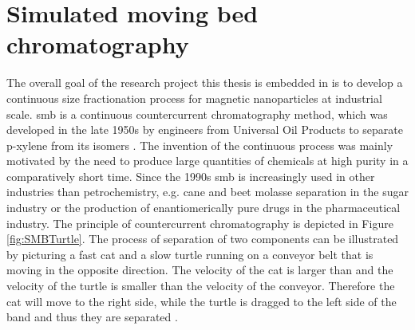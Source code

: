 \section{Simulated moving bed chromatography}
\label{sec:smb}
The overall goal of the research project this thesis is embedded in is to develop a continuous size fractionation process for magnetic nanoparticles at industrial scale. \Gls{smb} is a continuous countercurrent chromatography method, which was developed in the late 1950s by engineers from Universal Oil Products to separate p-xylene from its isomers \cite{broughton1961continuous,carson1962rotary}. The invention of the continuous process was mainly motivated by the need to produce large quantities of chemicals at high purity in a comparatively short time. Since the 1990s \gls{smb} is increasingly used in other industries than petrochemistry, e.g. cane and beet molasse separation in the sugar industry or the production of enantiomerically pure drugs in the pharmaceutical industry. The principle of countercurrent chromatography is depicted in Figure \ref{fig:SMBTurtle}. The process of separation of two components can be illustrated by picturing a fast cat and a slow turtle running on a conveyor belt that is moving in the opposite direction. The velocity of the cat is larger than and the velocity of the turtle is smaller than the velocity of the conveyor. Therefore the cat will move to the right side, while the turtle is dragged to the left side of the band and thus they are separated \cite{rajendran2009simulated}.  

\begin{figure}[H]
\centering
{}
\end{figure}


